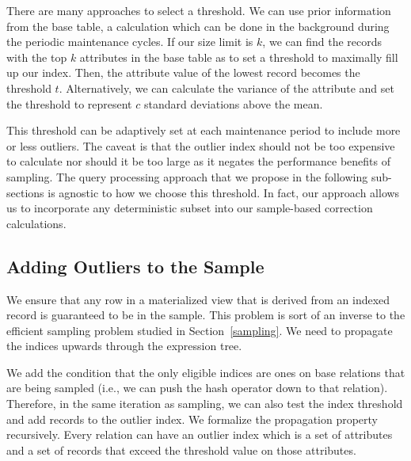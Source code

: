 There are many approaches to select a threshold.
We can use prior information from the base table, a calculation which can be done in the background during the periodic maintenance cycles.
If our size limit is $k$, we can find the records with the top $k$ attributes in the base table as to set a threshold to maximally fill up our index. 
Then, the attribute value of the lowest record becomes the threshold $t$.
Alternatively, we can calculate the variance of the attribute and set the threshold to represent $c$ standard deviations above the mean.

This threshold can be adaptively set at each maintenance period to include more or less outliers.
The caveat is that the outlier index should not be too expensive to calculate nor should it be too large as it negates the performance benefits of sampling.  
The query processing approach that we propose in the following sub-sections is agnostic to how we choose this threshold.
In fact, our approach allows us to incorporate any deterministic subset into our sample-based correction calculations.

\subsection{Adding Outliers to the Sample}
We ensure that any row in a materialized view that is derived from an indexed record is guaranteed to be in the sample.
This problem is sort of an inverse to the efficient sampling problem studied in Section~\ref{sampling}.
We need to propagate the indices upwards through the expression tree.

We add the condition that the only eligible indices are ones on base relations that are being sampled (i.e., we can push the hash operator down to that relation).
Therefore, in the same iteration as sampling, we can also test the index threshold and add records to the outlier index. 
We formalize the propagation property recursively. 
Every relation can have an outlier index which is a set of attributes and a set of records that exceed the threshold value on those attributes.

